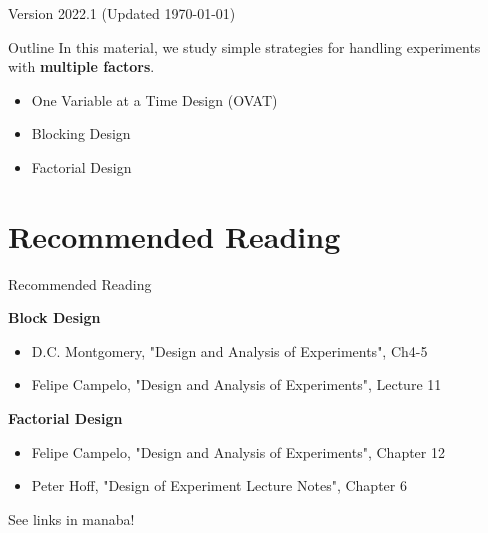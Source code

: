 \documentclass[aspectratio=169]{beamer}
\subtitle[Experimental Factors]{Topic 07 - Experimental Factors}
\date{}
\begin{document}
\begin{CJK}{UTF8}{ipxm}

\begin{frame}
  \maketitle

  \vfill

  \hfill \tiny{Version 2022.1 (Updated \today)}
\end{frame}

\begin{frame}{Outline}
  In this material, we study simple strategies for handling experiments with {\bf multiple factors}.
  \bigskip

  \begin{itemize}
    \item One Variable at a Time Design (OVAT)
    \item Blocking Design
    \item Factorial Design
  \end{itemize}
\end{frame}





\section{Recommended Reading}
\begin{frame}{Recommended Reading}
  
  {\bf Block Design}
  \begin{itemize}
    \item D.C. Montgomery, "Design and Analysis of Experiments", Ch4-5
    \item Felipe Campelo, "Design and Analysis of Experiments", Lecture 11
  \end{itemize}

  {\bf Factorial Design}
  \begin{itemize}
    \item Felipe Campelo, "Design and Analysis of Experiments", Chapter 12
    \item Peter Hoff, "Design of Experiment Lecture Notes", Chapter 6
  \end{itemize}
  \vfill

  See links in manaba!
\end{frame}


\end{CJK}
\end{document}
